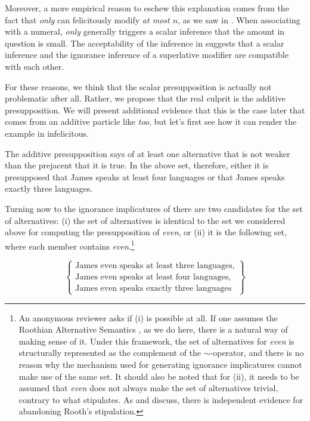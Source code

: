 \documentclass[output=paper]{langscibook}
\begin{document}
Moreover, a more empirical reason to eschew this explanation comes from the fact that \textit{only} can felicitously modify \textit{at most $n$}, as we saw in . When associating with a numeral, \textit{only} generally triggers a scalar inference that the amount in question is small. The acceptability of the inference in  suggests that a scalar inference and the ignorance inference of a superlative modifier are compatible with each other.

For these reasons, we think that the scalar presupposition is actually not problematic after all. Rather, we propose that the real culprit is the additive presupposition. We will present additional evidence that this is the case later that comes from an additive particle like \textit{too}, but let's first see how it can render the example in  infelicitous.

The additive presupposition says of at least one alternative that is not weaker than the prejacent that it is true. In the above set, therefore, either it is presupposed that James speaks at least four languages or that James speaks exactly three languages.

Turning now to the ignorance implicatures of  there are two candidates for the set of alternatives: (i) the set of alternatives is identical to the set we considered above for computing the presupposition of \textit{even}, or (ii) it is the following set, where each member contains \textit{even}.\footnote{An anonymous reviewer asks if (i) is possible at all. If one assumes the Roothian Alternative Semantics \citep{rooth:92}, as we do here, there is a natural way of making sense of it. Under this framework, the set of alternatives for \textit{even} is structurally represented as the complement of the $\mathord{\sim}$-operator, and there is no reason why the mechanism used for generating ignorance implicatures cannot make use of the same set. It should also be noted that for (ii), it needs to be assumed that \textit{even} does not always make the set of alternatives trivial, contrary to what \citet{rooth:92} stipulates. As \citet{krifka:91} and \citet{panizzasudo} discuss, there is independent evidence for abandoning Rooth's stipulation.}

  \[\left\{\begin{array}{l}
    \text{James even speaks at least three languages,}\\
    \text{James even speaks {at least four} languages,}\\
    \text{James even speaks {exactly three} languages}
  \end{array}\right\}\]
\end{document}
